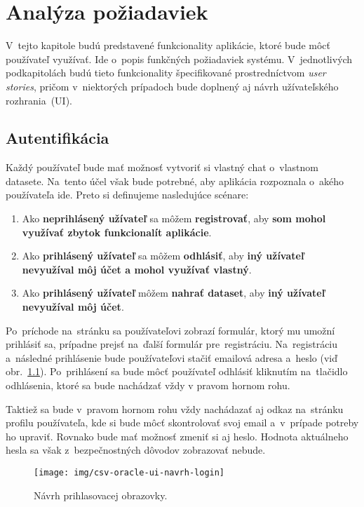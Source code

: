 \chapter{Analýza požiadaviek}
\label{requirements-analysis}

V~tejto kapitole budú predstavené funkcionality aplikácie, ktoré bude môcť používateľ využívať. Ide o~popis funkčných požiadaviek systému. V~jednotlivých podkapitolách budú tieto funkcionality špecifikované prostredníctvom \textit{user stories}, pričom v~niektorých prípadoch bude doplnený aj návrh užívateľského rozhrania~(UI).

\section{Autentifikácia}

Každý používateľ bude mať možnosť vytvoriť si vlastný chat o~vlastnom datasete. Na~tento účel však bude potrebné, aby aplikácia rozpoznala o~akého používateľa ide. Preto si definujeme nasledujúce scénare:

\begin{enumerate}
\item Ako \textbf{neprihlásený užívateľ} sa môžem \textbf{registrovať}, aby \textbf{som mohol využívať zbytok funkcionalít aplikácie}.
\item Ako \textbf{prihlásený užívateľ} sa môžem \textbf{odhlásiť}, aby \textbf{iný užívateľ nevyužíval môj účet a mohol využívať vlastný}.
\item Ako \textbf{prihlásený užívateľ} môžem \textbf{nahrať dataset}, aby \textbf{iný užívateľ nevyužíval môj účet}.
\end{enumerate}

Po~príchode na~stránku sa používateľovi zobrazí formulár, ktorý mu umožní prihlásiť sa, prípadne prejsť na~ďalší formulár pre~registráciu. Na~registráciu a~následné prihlásenie bude používateľovi stačiť emailová adresa a~heslo (viď obr.~\ref{csv-oracle-ui-navrh-login}). Po~prihlásení sa bude môcť používateľ odhlásiť kliknutím na~tlačidlo odhlásenia, ktoré sa bude nachádzať vždy v pravom hornom rohu.

Taktiež sa bude v~pravom hornom rohu vždy nachádazať aj odkaz na~stránku profilu používateľa, kde si bude môcť skontrolovať svoj email a~v~prípade potreby ho upraviť. Rovnako bude mať možnosť zmeniť si aj heslo. Hodnota aktuálneho hesla sa však z~bezpečnostných dôvodov zobrazovať nebude.

\begin{figure}[H]\centering
\texttt{[image: img/csv-oracle-ui-navrh-login]}
\caption{Návrh prihlasovacej obrazovky.}
\label{csv-oracle-ui-navrh-login}
\end{figure}

